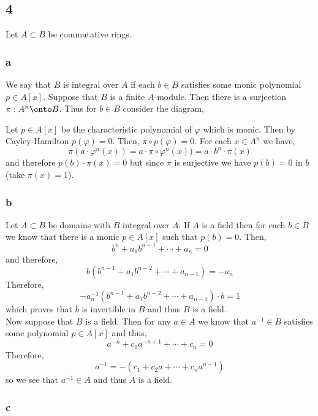 \documentclass[12pt]{article}
\begin{document}
\subsection{4}

Let $A \subset B$ be commutative rings. 

\subsubsection{a}

We say that $B$ is integral over $A$ if each $b \in B$ satisfies some monic polynomial $p \in A[x]$. Suppose that $B$ is a finite $A$-module. Then there is a surjection $\pi : A^n \onto B$. Thus for $b \in B$ consider the diagram,
\begin{center}
\end{center}
Let $p \in A[x]$ be the characteristic polynomial of $\varphi$ which is monic. Then by Cayley-Hamilton $p(\varphi) = 0$. Then, $\pi \circ p(\varphi) = 0$. For each $x \in A^n$ we have,
\[ \pi(a \cdot \varphi^n(x)) = a \cdot \pi \circ \varphi^n(x)) = a \cdot b^n \cdot \pi(x) \]
and therefore $p(b) \cdot \pi(x) = 0$ but since $\pi$ is surjective we have $p(b) = 0$ in $b$ (take $\pi(x) = 1$).

\subsubsection{b}

Let $A \subset B$ be domains with $B$ integral over $A$. If $A$ is a field then for each $b \in B$ we know that there is a monic $p \in A[x]$ such that $p(b) = 0$. Then,
\[ b^n + a_{1} b^{n-1} + \cdots + a_n = 0 \]
and therefore,
\[ b(b^{n-1} + a_1 b^{n-2} + \cdots + a_{n-1}) = - a_n \]
Therefore,
\[ - a_n^{-1} (b^{n-1} + a_1 b^{n-2} + \cdots + a_{n-1}) \cdot b = 1 \]
which proves that $b$ is invertible in $B$ and thus $B$ is a field. 
\bigskip\\
Now suppose that $B$ is a field. Then for any $a \in A$ we know that $a^{-1} \in B$ satisfies some polynomial $p \in A[x]$ and thus,
\[ a^{-n} + c_{1} a^{-n+1} + \cdots + c_n = 0 \]
Therefore,
\[ a^{-1} = -(c_1 + c_2 a + \cdots + c_n a^{n-1}) \]
so we see that $a^{-1} \in A$ and thus $A$ is a field.

\subsubsection{c}
\end{document}
